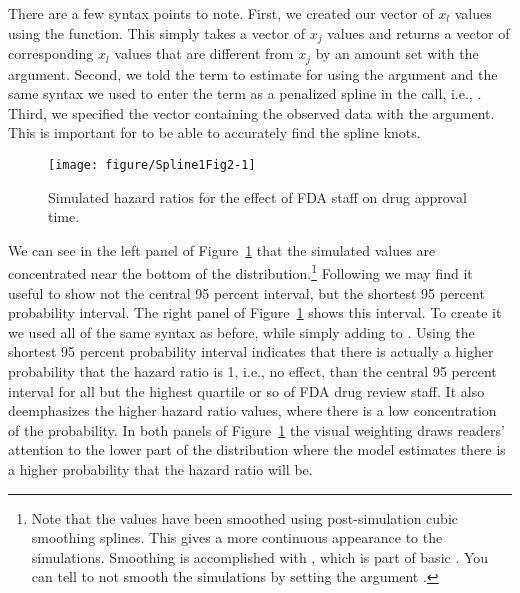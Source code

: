 \documentclass[nojss]{jss}\usepackage[]{graphicx}\usepackage[]{color}
\newenvironment{knitrout}{}{} %
\begin{document}
There are a few syntax points to note. First, we created our vector of $x_{l}$ values using the  function. This simply takes a vector of $x_{j}$ values and returns a vector of corresponding $x_{l}$ values that are different from $x_{j}$ by an amount set with the  argument. Second, we told  the term to estimate for using the  argument and the same syntax we used to enter the term as a penalized spline in the  call, i.e., . Third, we specified the vector containing the observed  data with the  argument. This is important for  to be able to accurately find the spline knots.

\begin{figure}

\begin{knitrout}
\color{fgcolor}

{\centering \texttt{[image: figure/Spline1Fig2-1]} 

}



\end{knitrout}

  \caption{Simulated hazard ratios for the effect of FDA staff on drug approval time.}
  \label{Spline1}

\end{figure}

We can see in the left panel of Figure~\ref{Spline1} that the simulated values are concentrated near the bottom of the distribution.\footnote{Note that the values have been smoothed using post-simulation cubic smoothing splines. This gives a more continuous appearance to the simulations. Smoothing is accomplished with , which is part of basic . You can tell  to not smooth the simulations by setting the argument .} Following \citeauthor{Liu2013} we may find it useful to show not the central 95 percent interval, but the shortest 95 percent probability interval. The right panel of Figure~\ref{Spline1} shows this interval. To create it we used all of the same syntax as before, while simply adding  to . Using the shortest 95 percent probability interval indicates that there is actually a higher probability that the hazard ratio is 1, i.e., no effect, than the central 95 percent interval for all but the highest quartile or so of FDA drug review staff. It also deemphasizes the higher hazard ratio values, where there is a low concentration of the probability. In both panels of Figure~\ref{Spline1} the visual weighting draws readers' attention to the lower part of the distribution where the model estimates there is a higher probability that the hazard ratio will be.
\end{document}
